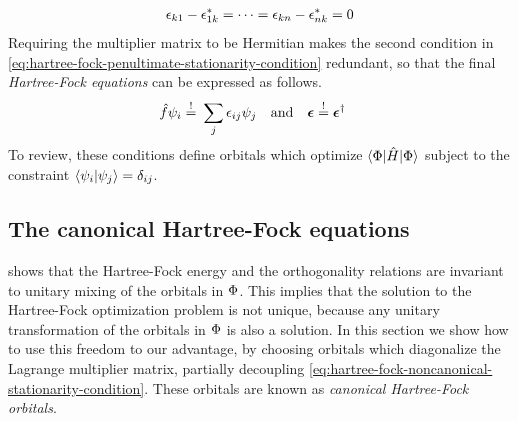 \documentclass[11pt]{article}
\numberwithin{equation}{section}
\begin{document}
\begin{align}
  \epsilon _{k1}-\epsilon _{1k}^*=\cdots=\epsilon _{kn}-\epsilon _{nk}^*=0
\end{align}
Requiring the multiplier matrix to be Hermitian makes the second condition in \cref{eq:hartree-fock-penultimate-stationarity-condition} redundant, so that the final \textit{Hartree-Fock equations} can be expressed as follows.
\begin{align}\label{eq:hartree-fock-noncanonical-stationarity-condition}
  \op{f}\y_i
\overset{!}=&\
  \sum_j
  \ev_{ij}
  \y_j
\hspace{10pt}
  \text{and}
\hspace{10pt}
  \bm{\ev}
\overset{!}=
  \bm{\ev}\dg
\end{align}
To review, these conditions define orbitals which optimize $\langle\Phi |\hat{H}|\Phi \rangle$ subject to the constraint $\langle\psi _i|\psi _j\rangle=\delta _{ij}$.



\subsection{The canonical Hartree-Fock equations}


 shows that the Hartree-Fock energy and the orthogonality relations are invariant to unitary mixing of the orbitals in $\Phi $.
This implies that the solution to the Hartree-Fock optimization problem is not unique, because any unitary transformation of the orbitals in $\Phi $ is also a solution.
In this section we show how to use this freedom to our advantage, by choosing orbitals which diagonalize the Lagrange multiplier matrix, partially decoupling \cref{eq:hartree-fock-noncanonical-stationarity-condition}.
These orbitals are known as \textit{canonical Hartree-Fock orbitals}.
\end{document}
